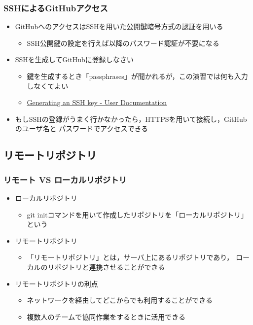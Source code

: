 \documentclass[a4paper,twoside,twocolumn]{bxjsarticle}
\begin{document}
\subsubsection{SSHによるGitHubアクセス}
\label{sec-2-1-3}
\begin{itemize}
\item GitHubへのアクセスはSSHを用いた公開鍵暗号方式の認証を用いる
\begin{itemize}
\item SSH公開鍵の設定を行えば以降のパスワード認証が不要になる
\end{itemize}
\item SSHを生成してGitHubに登録しなさい
\begin{itemize}
\item 鍵を生成するとき「passphrases」が聞かれるが，この演習では何も入力しなくてよい
\item \href{https://help.github.com/articles/generating-an-ssh-key/}{Generating an SSH key - User Documentation}
\end{itemize}
\item もしSSHの登録がうまく行かなかったら，HTTPSを用いて接続し，GitHubのユーザ名と
パスワードでアクセスできる
\end{itemize}

\subsection{リモートリポジトリ}
\label{sec-2-2}
\subsubsection{リモート VS ローカルリポジトリ}
\label{sec-2-2-1}
\begin{itemize}
\item ローカルリポジトリ
\begin{itemize}
\item git initコマンドを用いて作成したリポジトリを「ローカルリポジトリ」という
\end{itemize}
\item リモートリポジトリ
\begin{itemize}
\item 「リモートリポジトリ」とは，サーバ上にあるリポジトリであり，
ローカルのリポジトリと連携させることができる
\end{itemize}
\item リモートリポジトリの利点
\begin{itemize}
\item ネットワークを経由してどこからでも利用することができる
\item 複数人のチームで協同作業をするときに活用できる
\end{itemize}
\end{itemize}
\end{document}

